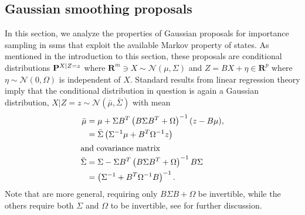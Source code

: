 \subsection{Gaussian smoothing proposals}
\label{subsec:gaussian_smoothing_proposals}
In this section, we analyze the properties of Gaussian proposals for importance sampling in \glspl{ssm} that exploit the available Markov property of states. As mentioned in the introduction to this section, these proposals are conditional distributions $\P^{X|Z=z}$ where $ \mathbf{R}^{m} \ni X \sim \mathcal N \left( \mu, \Sigma \right)$ and $Z = BX + \eta \in \mathbf{R}^{p}$ where $\eta\sim\mathcal N(0, \Omega)$ is independent of $X$. Standard results from linear regression theory imply that the conditional distribution in question is again a Gaussian distribution, $X|Z=z \sim \mathcal N(\bar \mu, \bar \Sigma)$ with mean
\begin{align}
    \bar \mu    & = \mu + \Sigma B^{T} \left( B \Sigma B^{T} + \Omega \right)^{-1} (z - B \mu), \label{eq:posterior_mean_1} \\
                & = \bar \Sigma\left(\Sigma^{-1}\mu + B^{T}\Omega^{-1}z \right)\label{eq:posterior_mean_2}                  \\
    \intertext{and covariance matrix}
    \bar \Sigma & = \Sigma - \Sigma B^T \left( B\Sigma B^{T} + \Omega \right) ^{-1} B \Sigma \label{eq:posterior_cov_1}     \\
                & = \left(\Sigma^{-1} + B^{T}\Omega^{-1}B\right)^{-1} \label{eq:posterior_cov_2}.
\end{align}
Note that  are more general, requiring only $B \Sigma B + \Omega$ be invertible, while the others require both $\Sigma$ and $\Omega$ to be invertible, see \cite[Lemma 7.1]{Chopin2020Introduction} for further discussion.

